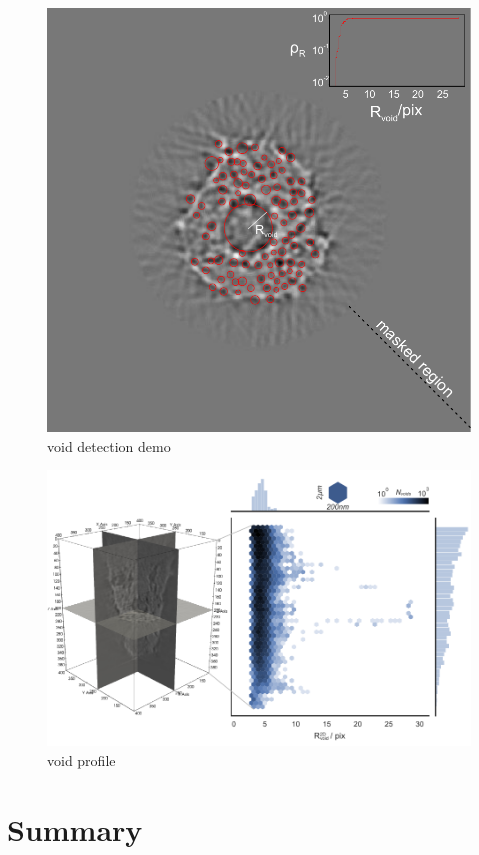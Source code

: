 \documentclass[12pt]{scrartcl}
\newcommand{\myscale}{1}
\begin{document}
\renewcommand{\myscale}{1.0}
\begin{figure}
\centering
\includegraphics[scale=\myscale]{voidDetectionDemo_mid}
\caption{
void detection demo
}\label{fig: void detection demo}
\end{figure}

\renewcommand{\myscale}{1.0}
\begin{figure}
\centering
\includegraphics[scale=\myscale]{void_profile}
\caption{
void profile
}\label{fig: void profile}
\end{figure}


\section{Summary}\label{sec: summary}




\end{document}
